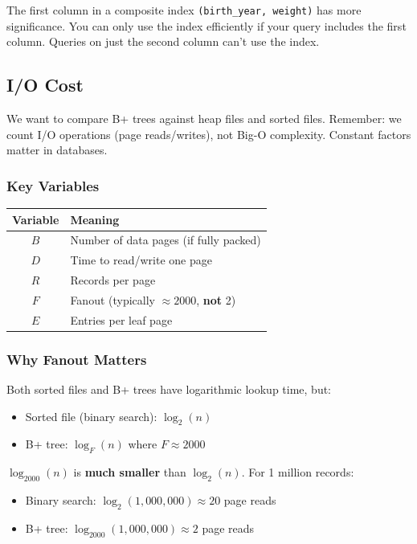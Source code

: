 The first column in a composite index \texttt{(birth\_year, weight)} has more significance. You can only use the index efficiently if your query includes the first column. Queries on just the second column can't use the index.

\subsection{I/O Cost}

We want to compare B+ trees against heap files and sorted files. Remember: we count I/O operations (page reads/writes), not Big-O complexity. Constant factors matter in databases.

\subsubsection*{Key Variables}

\begin{table}[H]
    \centering
    \begin{tabular}{cl}
        \toprule
        \textbf{Variable} & \textbf{Meaning} \\
        \midrule
        $B$ & Number of data pages (if fully packed) \\
        $D$ & Time to read/write one page \\
        $R$ & Records per page \\
        $F$ & Fanout (typically $\approx 2000$, \textbf{not} 2) \\
        $E$ & Entries per leaf page \\
        \bottomrule
    \end{tabular}
\end{table}

\subsubsection*{Why Fanout Matters}

Both sorted files and B+ trees have logarithmic lookup time, but:
\begin{itemize}
    \item Sorted file (binary search): $\log_2(n)$
    \item B+ tree: $\log_F(n)$ where $F \approx 2000$
\end{itemize}

$\log_{2000}(n)$ is \textbf{much smaller} than $\log_2(n)$. For 1 million records:
\begin{itemize}
    \item Binary search: $\log_2(1{,}000{,}000) \approx 20$ page reads
    \item B+ tree: $\log_{2000}(1{,}000{,}000) \approx 2$ page reads
\end{itemize}

